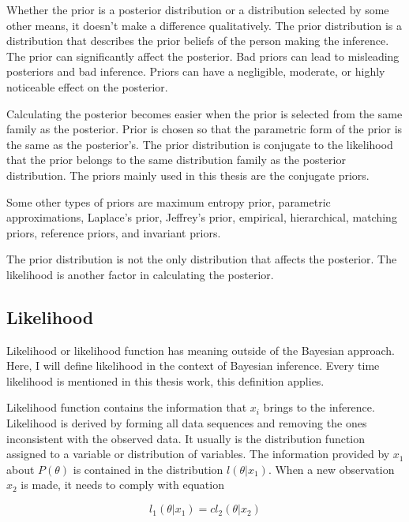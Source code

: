 Whether the prior is a posterior distribution or a distribution selected by some other means, it doesn't make a difference qualitatively. The prior distribution is a distribution that describes the prior beliefs of the person making the inference.\cite{Lindley1990The1W} The prior can significantly affect the posterior. Bad priors can lead to misleading posteriors and bad inference.\cite{Mcelreath2015StatisticalRA} Priors can have a negligible, moderate, or highly noticeable effect on the posterior.\cite{Robert2007TheBC}

Calculating the posterior becomes easier when the prior is selected from the same family as the posterior. Prior is chosen so that the parametric form of the prior is the same as the posterior's. The prior distribution is conjugate to the likelihood that the prior belongs to the same distribution family as the posterior distribution. \cite{SUGIYAMA2016185} The priors mainly used in this thesis are the conjugate priors.

Some other types of priors are maximum entropy prior, parametric approximations, Laplace's prior, Jeffrey's prior, empirical, hierarchical, matching priors, reference priors, and invariant priors. \cite{Robert2007TheBC}

The prior distribution is not the only distribution that affects the posterior. The likelihood is another factor in calculating the posterior.

\subsection{Likelihood}\label{Likelihood}
Likelihood or likelihood function has meaning outside of the Bayesian approach. Here, I will define likelihood in the context of Bayesian inference. Every time likelihood is mentioned in this thesis work, this definition applies. 

Likelihood function contains the information that $x_i$ brings to the inference.\cite{Robert2007TheBC} Likelihood is derived by forming all data sequences and removing the ones inconsistent with the observed data. It usually is the distribution function assigned to a variable or distribution of variables. \cite{Mcelreath2015StatisticalRA} The information provided by $x_1$ about $P(\theta)$ is contained in the distribution $l(\theta|x_1)$. When a new observation $x_2$ is made, it needs to comply with equation

\begin{equation}\label{LikelihoodPrinsiple}
l_1(\theta|x_1) = cl_2(\theta|x_2)
\end{equation}\cite{Robert2007TheBC}

